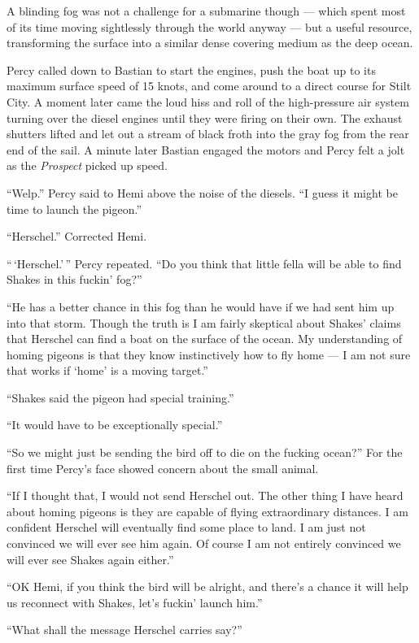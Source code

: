 \documentclass[]{scrbook}
\begin{document}
A blinding fog was not a challenge for a submarine though --- which
spent most of its time moving sightlessly through the world anyway ---
but a useful resource, transforming the surface into a similar dense
covering medium as the deep ocean.

Percy called down to Bastian to start the engines, push the boat up to
its maximum surface speed of 15 knots, and come around to a direct
course for Stilt City. A moment later came the loud hiss and roll of the
high-pressure air system turning over the diesel engines until they were
firing on their own. The exhaust shutters lifted and let out a stream of
black froth into the gray fog from the rear end of the sail. A minute
later Bastian engaged the motors and Percy felt a jolt as the
\emph{Prospect} picked up speed.

``Welp.'' Percy said to Hemi above the noise of the diesels. ``I guess
it might be time to launch the pigeon.''

``Herschel.'' Corrected Hemi.

``\,`Herschel.'\,'' Percy repeated. ``Do you think that little fella
will be able to find Shakes in this fuckin' fog?''

``He has a better chance in this fog than he would have if we had sent
him up into that storm. Though the truth is I am fairly skeptical about
Shakes' claims that Herschel can find a boat on the surface of the
ocean. My understanding of homing pigeons is that they know
instinctively how to fly home --- I am not sure that works if `home' is
a moving target.''

``Shakes said the pigeon had special training.''

``It would have to be exceptionally special.''

``So we might just be sending the bird off to die on the fucking
ocean?'' For the first time Percy's face showed concern about the small
animal.

``If I thought that, I would not send Herschel out. The other thing I
have heard about homing pigeons is they are capable of flying
extraordinary distances. I am confident Herschel will eventually find
some place to land. I am just not convinced we will ever see him again.
Of course I am not entirely convinced we will ever see Shakes again
either.''

``OK Hemi, if you think the bird will be alright, and there's a chance
it will help us reconnect with Shakes, let's fuckin' launch him.''

``What shall the message Herschel carries say?''
\end{document}
